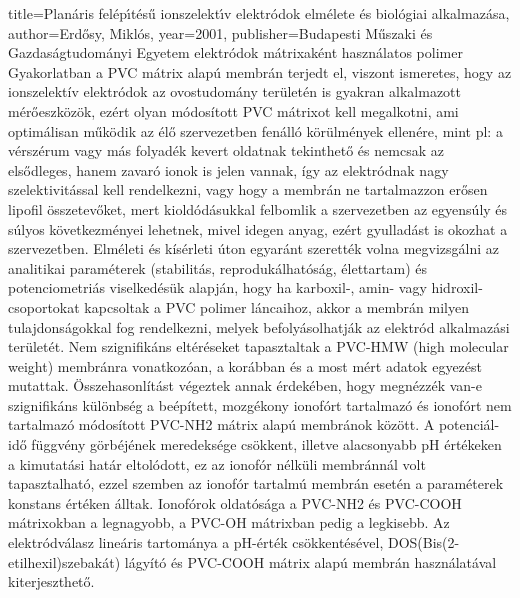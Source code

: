 {{  title={Plan{\'a}ris fel{\'e}p{\'\i}t{\'e}s{\H{u}} ionszelekt{\'\i}v elektr{\'o}dok elm{\'e}lete {\'e}s biol{\'o}giai alkalmaz{\'a}sa},
  author={Erd{\H{o}}sy, Mikl{\'o}s},
  year={2001},
  publisher={Budapesti M{\H{u}}szaki {\'e}s Gazdas{\'a}gtudom{\'a}nyi Egyetem}
}
 elektródok mátrixaként használatos polimer
Gyakorlatban a PVC mátrix alapú membrán terjedt el, viszont ismeretes, hogy az ionszelektív elektródok az ovostudomány területén is gyakran alkalmazott mérőeszközök, ezért olyan módosított PVC mátrixot kell megalkotni, ami optimálisan működik az élő szervezetben fenálló körülmények ellenére, mint pl: a vérszérum vagy más folyadék kevert oldatnak tekinthető és nemcsak az elsődleges, hanem zavaró ionok is jelen vannak, így az elektródnak nagy szelektivitással  kell rendelkezni, vagy hogy a membrán ne tartalmazzon erősen lipofil összetevőket, mert kioldódásukkal felbomlik a szervezetben az egyensúly és súlyos következményei lehetnek, mivel idegen anyag, ezért gyulladást is okozhat a szervezetben.  Elméleti és kísérleti úton egyaránt szerették volna megvizsgálni az analitikai paraméterek (stabilitás, reprodukálhatóság, élettartam) és potenciometriás viselkedésük alapján, hogy ha karboxil-, amin- vagy hidroxil-csoportokat kapcsoltak a PVC polimer láncaihoz, akkor a membrán milyen tulajdonságokkal fog rendelkezni, melyek befolyásolhatják az elektród alkalmazási területét. Nem szignifikáns eltéréseket tapasztaltak  a PVC-HMW (high molecular weight) membránra vonatkozóan, a korábban és a most mért adatok egyezést mutattak. Összehasonlítást végeztek annak érdekében, hogy megnézzék van-e szignifikáns különbség a beépített, mozgékony ionofórt tartalmazó és ionofórt nem tartalmazó módosított PVC-NH2 mátrix alapú membránok között. A potenciál-idő függvény görbéjének meredeksége csökkent, illetve alacsonyabb pH értékeken a kimutatási határ eltolódott, ez az ionofór nélküli membránnál volt tapasztalható, ezzel szemben az ionofór tartalmú membrán esetén a paraméterek konstans értéken álltak. Ionofórok oldatósága a PVC-NH2 és PVC-COOH mátrixokban a legnagyobb, a PVC-OH mátrixban pedig a legkisebb. Az elektródválasz lineáris tartománya a pH-érték csökkentésével, DOS(Bis(2-etilhexil)szebakát) lágyító és PVC-COOH mátrix alapú membrán használatával kiterjeszthető.

}

